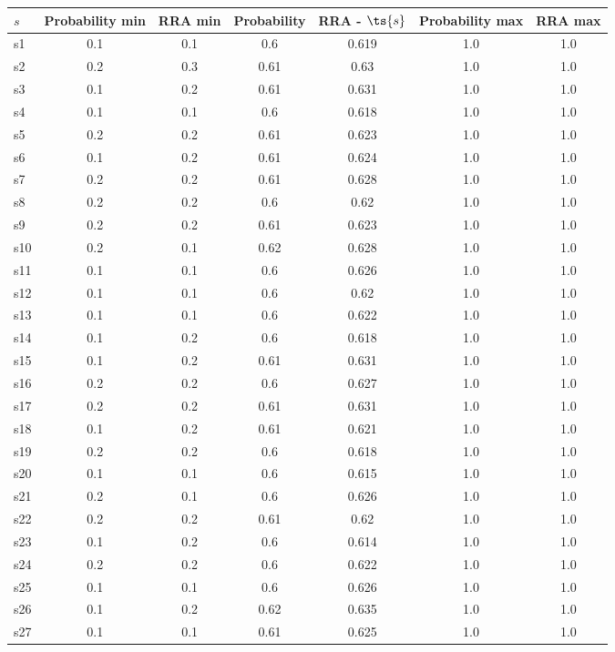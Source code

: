 \documentclass{article}
\begin{document}
\noindent\begin{tabular}{|l|c|c|c|c|c|c|}
\hline
$s$& Probability min & RRA min & Probability & RRA - $\ts{s}$ & Probability max & RRA max\\
\hline
s1 &0.1 & 0.1 & 0.6 & 0.619 & 1.0 & 1.0\\
\hline
s2 &0.2 & 0.3 & 0.61 & 0.63 & 1.0 & 1.0\\
\hline
s3 &0.1 & 0.2 & 0.61 & 0.631 & 1.0 & 1.0\\
\hline
s4 &0.1 & 0.1 & 0.6 & 0.618 & 1.0 & 1.0\\
\hline
s5 &0.2 & 0.2 & 0.61 & 0.623 & 1.0 & 1.0\\
\hline
s6 &0.1 & 0.2 & 0.61 & 0.624 & 1.0 & 1.0\\
\hline
s7 &0.2 & 0.2 & 0.61 & 0.628 & 1.0 & 1.0\\
\hline
s8 &0.2 & 0.2 & 0.6 & 0.62 & 1.0 & 1.0\\
\hline
s9 &0.2 & 0.2 & 0.61 & 0.623 & 1.0 & 1.0\\
\hline
s10 &0.2 & 0.1 & 0.62 & 0.628 & 1.0 & 1.0\\
\hline
s11 &0.1 & 0.1 & 0.6 & 0.626 & 1.0 & 1.0\\
\hline
s12 &0.1 & 0.1 & 0.6 & 0.62 & 1.0 & 1.0\\
\hline
s13 &0.1 & 0.1 & 0.6 & 0.622 & 1.0 & 1.0\\
\hline
s14 &0.1 & 0.2 & 0.6 & 0.618 & 1.0 & 1.0\\
\hline
s15 &0.1 & 0.2 & 0.61 & 0.631 & 1.0 & 1.0\\
\hline
s16 &0.2 & 0.2 & 0.6 & 0.627 & 1.0 & 1.0\\
\hline
s17 &0.2 & 0.2 & 0.61 & 0.631 & 1.0 & 1.0\\
\hline
s18 &0.1 & 0.2 & 0.61 & 0.621 & 1.0 & 1.0\\
\hline
s19 &0.2 & 0.2 & 0.6 & 0.618 & 1.0 & 1.0\\
\hline
s20 &0.1 & 0.1 & 0.6 & 0.615 & 1.0 & 1.0\\
\hline
s21 &0.2 & 0.1 & 0.6 & 0.626 & 1.0 & 1.0\\
\hline
s22 &0.2 & 0.2 & 0.61 & 0.62 & 1.0 & 1.0\\
\hline
s23 &0.1 & 0.2 & 0.6 & 0.614 & 1.0 & 1.0\\
\hline
s24 &0.2 & 0.2 & 0.6 & 0.622 & 1.0 & 1.0\\
\hline
s25 &0.1 & 0.1 & 0.6 & 0.626 & 1.0 & 1.0\\
\hline
s26 &0.1 & 0.2 & 0.62 & 0.635 & 1.0 & 1.0\\
\hline
s27 &0.1 & 0.1 & 0.61 & 0.625 & 1.0 & 1.0\\

\end{tabular}
\end{document}
